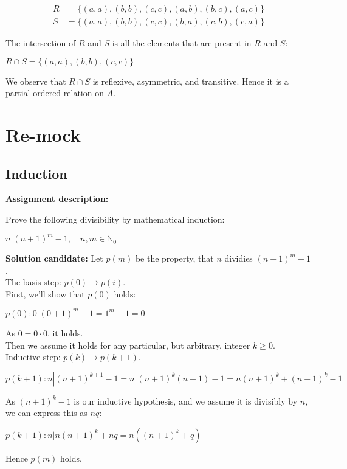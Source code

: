 \documentclass{report}
\newcommand{\cent}[1]{\begin{center}#1\end{center}}
\newcommand{\mAlign}[1]{\begin{align*}#1\end{align*}}
\newcommand{\doubleN}{\mathbb{N}}
\newcommand{\In}{\! \in \!}
\newcommand{\AssignmentDescription}{\textbf{Assignment description: }}
\newcommand{\Solution}{\textbf{Solution candidate: }}
\newcommand{\QED}{\boxed{}}
\begin{document}
	\mAlign{R&=\{(a,a),(b,b),(c,c),(a,b),(b,c),(a,c)\}\\
	 			   S&= \{(a,a),(b,b),(c,c),(b,a),(c,b),(c,a)\}}
	 
	The intersection of $R$ and $S$ is all the elements that are present in $R$ and $S$:
	 
	\cent{$R \cap S = \{(a,a),(b,b),(c,c)\}$}
	 
	We observe that $R \cap S$ is reflexive, asymmetric, and transitive.  Hence it is a partial ordered relation on $A$.
	
	\section{Re-mock}
	
	\subsection{Induction}
	
	\AssignmentDescription
	
	Prove the following divisibility by mathematical induction:
	
	\cent{$n|(n+1)^m-1, \quad n,m \In \doubleN_0$}
	
	\Solution
	Let $p(m)$ be the property, that  $n$ dividies $(n+1)^m - 1$.\\
	
	The basis step: $p(0) \to p(i)$.\\
	
	First, we'll show that $p(0)$ holds:
	
	\cent{$p(0) : 0 | (0 + 1)^m - 1 = 1^m - 1 = 0$}
	
	As $0 = 0 \cdot 0$, it holds.\\
	
	Then we assume it holds for any particular, but arbitrary, integer $k \geq 0$.\\
	
	Inductive step: $p(k) \to p(k+1)$.\\
	
	\cent{$p(k+1) : n | (n+1)^{k+1} - 1 = n | (n+1)^k(n+1) - 1 = n(n+1)^k + (n+1)^k - 1$}
	
	As $(n+1)^k -1$ is our inductive hypothesis, and we assume it is divisibly by $n$, we can express this as $nq$:
	
	\cent{$p(k+1) : n|n(n+1)^k + nq = n((n+1)^k + q)$}
	
	Hence  $p(m)$ holds.\\
	\QED
	
\end{document}
